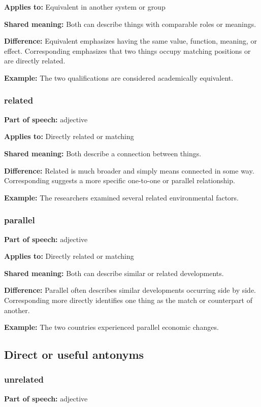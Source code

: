 \documentclass[11pt]{article}
\begin{document}
\textbf{Applies to:} Equivalent in another system or group

\textbf{Shared meaning:} Both can describe things with comparable roles or meanings.

\textbf{Difference:} Equivalent emphasizes having the same value, function, meaning, or effect. Corresponding emphasizes that two things occupy matching positions or are directly related.

\textbf{Example:} The two qualifications are considered academically equivalent.

\subsubsection{related}
\textbf{Part of speech:} adjective

\textbf{Applies to:} Directly related or matching

\textbf{Shared meaning:} Both describe a connection between things.

\textbf{Difference:} Related is much broader and simply means connected in some way. Corresponding suggests a more specific one-to-one or parallel relationship.

\textbf{Example:} The researchers examined several related environmental factors.

\subsubsection{parallel}
\textbf{Part of speech:} adjective

\textbf{Applies to:} Directly related or matching

\textbf{Shared meaning:} Both can describe similar or related developments.

\textbf{Difference:} Parallel often describes similar developments occurring side by side. Corresponding more directly identifies one thing as the match or counterpart of another.

\textbf{Example:} The two countries experienced parallel economic changes.

\subsection{Direct or useful antonyms}
\subsubsection{unrelated}
\textbf{Part of speech:} adjective
\end{document}
